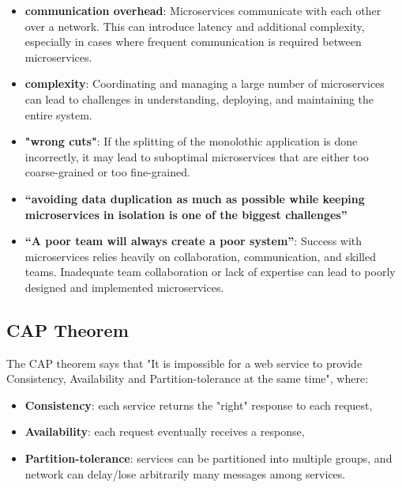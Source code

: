 \begin{itemize}
   \item \textbf{communication overhead}: Microservices communicate with each other over a network. This can introduce latency and additional complexity, especially in cases where frequent communication is required between microservices.
   \item \textbf{complexity}: Coordinating and managing a large number of microservices can lead to challenges in understanding, deploying, and maintaining the entire system.
   \item \textbf{"wrong cuts"}: If the splitting of the monolothic application is done incorrectly, it may lead to suboptimal microservices that are either too coarse-grained or too fine-grained.
   \item \textbf{“avoiding data duplication as much as possible while keeping microservices in isolation is one of the biggest challenges”}
   \item \textbf{“A poor team will always create a poor system”}: Success with microservices relies heavily on collaboration, communication, and skilled teams. Inadequate team collaboration or lack of expertise can lead to poorly designed and implemented microservices.
\end{itemize}

\subsection{CAP Theorem}
The CAP theorem says that "It is impossible for a web service to provide Consistency, Availability and Partition-tolerance at the same time", where:
\begin{itemize}
   \item \textbf{Consistency}: each service returns the "right" response to each request,
   \item \textbf{Availability}: each request eventually receives a response,
   \item \textbf{Partition-tolerance}: services can be partitioned into multiple groups, and network can delay/lose arbitrarily many messages among services.
\end{itemize}
